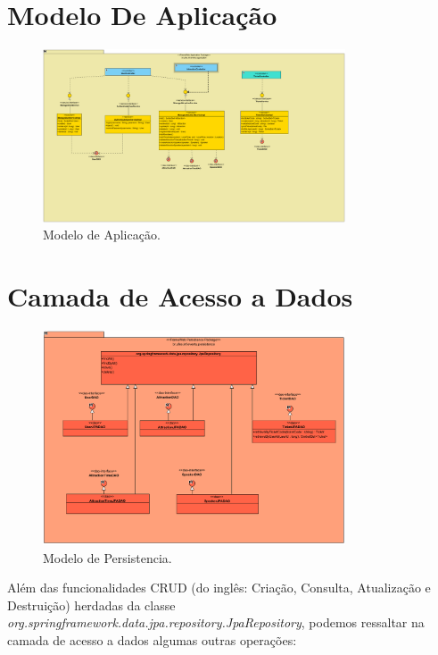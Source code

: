 \section{Modelo De Aplicação}
\label{sec-frameweb-app}


\begin{figure}[h]
	\centering
	\includegraphics[width=0.8\textwidth]{figuras/ModeloAplicacao.PNG}
	\caption{Modelo de Aplicação.}
	\label{figura-app}
\end{figure}


\section{Camada de Acesso a Dados}
\label{sec-frameweb-dados}


\begin{figure}[h]
	\centering
	\includegraphics[width=0.8\textwidth]{figuras/ClassesDePersistencia.PNG}
	\caption{Modelo de Persistencia.}
	\label{figura-persistencia}
\end{figure}

Além das funcionalidades CRUD (do inglês: Criação, Consulta, Atualização e Destruição) herdadas da classe \textit{org.springframework.data.jpa.repository.JpaRepository}, podemos ressaltar na camada de acesso a dados algumas outras operações:

